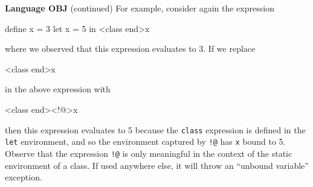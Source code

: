 \begin{minipage}[t]{\sw}
\slidenumber
\LARGE
{\bf Language OBJ} (continued)\exx
For example, consider again the expression
\begin{qv}
define x = 3
let
  x = 5
in
  <class end>x
\end{qv}
where we observed that this expression evaluates to 3.
If we replace
\begin{qv}
<class end>x
\end{qv}
in the above expression with
\begin{qv}
<class end><!@>x
\end{qv}
then this expression evaluates to 5
because the \verb'class' expression is defined
in the \verb'let' environment,
and so the environment captured by \verb'!@'
has \verb'x' bound to 5.\exx
Observe that the expression \verb'!@' is only meaningful
in the context of the static environment of a class.
If used anywhere else, it will throw an ``unbound variable'' exception.
\end{minipage}
